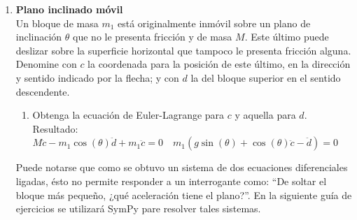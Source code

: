 \documentclass[11pt, a4paper, twoside]{article}
\begin{document}
\begin{enumerate}
\item
	\begin{minipage}[t][4.5cm]{0.7\textwidth}
		\textbf{Plano inclinado móvil}\\
		Un bloque de masa \(m_1\) está originalmente inmóvil sobre un plano de inclinación \(\theta\) que no le presenta fricción y de masa \(M\).
		Este último puede deslizar sobre la superficie horizontal que tampoco le presenta fricción alguna.
		Denomine con \(c\) la coordenada para la posición de este último, en la dirección y sentido indicado por la flecha; y con \(d\) la del bloque superior en el sentido descendente.
		\begin{enumerate}
			\item Obtenga la ecuación de Euler-Lagrange para \(c\) y aquella para \(d\).\\ 
			Resultado:
			\(
				M \ddot{c} - m_1 \cos{\left(\theta \right)} \ddot{d} + m_1 \ddot{c} = 0
				\quad
				m_1 \left(g \sin{\left(\theta \right)} + \cos{\left(\theta \right)} \ddot{c} - \ddot{d }\right) = 0
			\)
		\end{enumerate}
	\end{minipage}
	\begin{minipage}[c][0cm][t]{0.3\textwidth}
		
	\end{minipage}
	Puede notarse que como se obtuvo un sistema de dos ecuaciones diferenciales ligadas, ésto no permite responder a un interrogante como: ``De soltar el bloque más pequeño, ¿qué aceleración tiene el plano?''.
	En la siguiente guía de ejercicios se utilizará SymPy pare resolver tales sistemas.
	


\end{enumerate}
\end{document}
